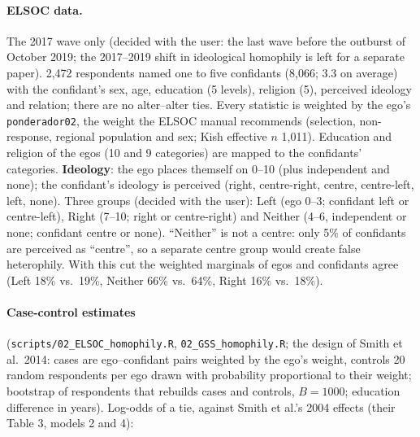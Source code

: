 \documentclass[11pt,a4paper]{article}
\newcommand{\code}[1]{\texttt{#1}}
\begin{document}
\paragraph{ELSOC data.} The 2017 wave only (decided with the user: the last wave before the outburst of
October 2019; the 2017--2019 shift in ideological homophily is left for a separate paper). 2{,}472
respondents named one to five confidants (8{,}066; 3.3 on average) with the confidant's sex, age,
education (5 levels), religion (5), perceived ideology and relation; there are no alter--alter ties.
Every statistic is weighted by the ego's \code{ponderador02}, the weight the ELSOC manual recommends
(selection, non-response, regional population and sex; Kish effective $n$ 1{,}011). Education and
religion of the egos (10 and 9 categories) are mapped to the confidants' categories. \textbf{Ideology}:
the ego places themself on 0--10 (plus independent and none); the confidant's ideology is perceived
(right, centre-right, centre, centre-left, left, none). Three groups (decided with the user): Left (ego
0--3; confidant left or centre-left), Right (7--10; right or centre-right) and Neither (4--6,
independent or none; confidant centre or none). ``Neither'' is not a centre: only 5\% of confidants
are perceived as ``centre'', so a separate centre group would create false heterophily. With this cut
the weighted marginals of egos and confidants agree (Left 18\% vs.\ 19\%, Neither 66\% vs.\ 64\%, Right
16\% vs.\ 18\%).

\paragraph{Case-control estimates} (\code{scripts/02\_ELSOC\_homophily.R}, \code{02\_GSS\_homophily.R};
the design of Smith et al.\ 2014: cases are ego--confidant pairs weighted by the ego's weight, controls
20 random respondents per ego drawn with probability proportional to their weight; bootstrap of
respondents that rebuilds cases and controls, $B = 1000$; education difference in years). Log-odds of a
tie, against Smith et al.'s 2004 effects (their Table 3, models 2 and 4):
\end{document}
